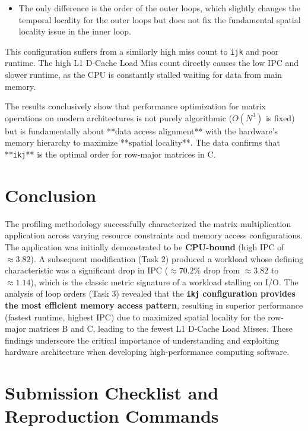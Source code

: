 \documentclass[11pt, a4paper]{article}
\begin{document}
\begin{itemize}
\begin{itemize}
        \item The only difference is the order of the outer loops, which slightly changes the temporal locality for the outer loops but does not fix the fundamental spatial locality issue in the inner loop.
    \end{itemize}
    This configuration suffers from a similarly high miss count to \texttt{ijk} and poor runtime. The high L1 D-Cache Load Miss count directly causes the low IPC and slower runtime, as the CPU is constantly stalled waiting for data from main memory.
\end{itemize}

The results conclusively show that performance optimization for matrix operations on modern architectures is not purely algorithmic ($O(N^3)$ is fixed) but is fundamentally about **data access alignment** with the hardware's memory hierarchy to maximize **spatial locality**. The data confirms that **\texttt{ikj}** is the optimal order for row-major matrices in C.

\section{Conclusion}
The profiling methodology successfully characterized the matrix multiplication application across varying resource constraints and memory access configurations. The application was initially demonstrated to be \textbf{CPU-bound} (high IPC of $\approx 3.82$). A subsequent modification (Task 2) produced a workload whose defining characteristic was a significant drop in IPC ($\approx 70.2\%$ drop from $\approx 3.82$ to $\approx 1.14$), which is the classic metric signature of a workload stalling on I/O. The analysis of loop orders (Task 3) revealed that the \textbf{\texttt{ikj} configuration provides the most efficient memory access pattern}, resulting in superior performance (fastest runtime, highest IPC) due to maximized spatial locality for the row-major matrices B and C, leading to the fewest L1 D-Cache Load Misses. These findings underscore the critical importance of understanding and exploiting hardware architecture when developing high-performance computing software.
\section{Submission Checklist and Reproduction Commands}
\end{document}
